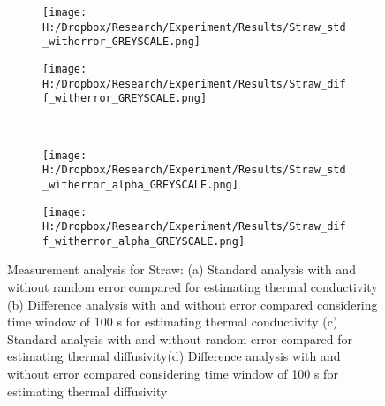 \documentclass[12pt]{report}
\begin{document}
\begin{figure}
\begin{subfigure}{.5\textwidth}
\centering
\texttt{[image: H:/Dropbox/Research/Experiment/Results/Straw\_std\_witherror\_GREYSCALE.png]}
\caption{}
\end{subfigure}\hfill
\begin{subfigure}{.5\textwidth}
\centering
\texttt{[image: H:/Dropbox/Research/Experiment/Results/Straw\_diff\_witherror\_GREYSCALE.png]}
\caption{}
\end{subfigure}\\
\begin{subfigure}{.5\textwidth}
\centering
\texttt{[image: H:/Dropbox/Research/Experiment/Results/Straw\_std\_witherror\_alpha\_GREYSCALE.png]}
\caption{}
\end{subfigure}\hfill
\begin{subfigure}{.5\textwidth}
\centering
\texttt{[image: H:/Dropbox/Research/Experiment/Results/Straw\_diff\_witherror\_alpha\_GREYSCALE.png]}
\caption{}
\end{subfigure}
\caption{Measurement analysis for Straw: (a) Standard analysis with and without random error compared for estimating thermal conductivity (b) Difference analysis with and without error compared considering time window of 100 s for estimating thermal conductivity (c) Standard analysis with and without random error compared for estimating thermal diffusivity(d) Difference analysis with and without error compared considering time window of 100 s for estimating thermal diffusivity}

\end{figure}
\end{document}
